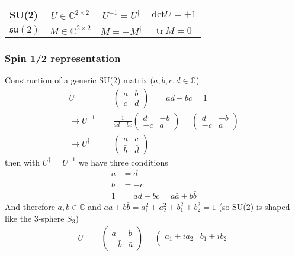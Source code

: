 \documentclass[../main.tex]{subfiles}
\begin{document}
\begin{itemize}
\begin{center}
\begin{tabular}{|l|c|c|c|}
\hline
SU(2)              & $U\in\mathbb{C}^{2\times2} $ & $U^{-1}=U^\dagger$ & $\text{det}U=+1$ \\ \hline
$\mathfrak{su}(2)$ & $M\in\mathbb{C}^{2\times2} $ & $M=-M^\dagger$ & $\text{tr}\,M=0$ \\ \hline
\end{tabular}
\end{center}

\subsubsection{Spin 1/2 representation}

Construction of a generic SU(2) matrix ($a, b, c, d\in\mathbb{C}$)
\begin{align*}
U&=\left(
\begin{matrix}
a & b\\
c & d
\end{matrix}
\right)\qquad ad-bc=1\\
\rightarrow U^{-1}&=\frac{1}{ad-bc}\left(
\begin{matrix}
d & -b\\
-c & a
\end{matrix}
\right)=\left(\begin{matrix}
d & -b\\
-c & a
\end{matrix}
\right)\\
\rightarrow U^\dagger&=\left(
\begin{matrix}
\bar{a} & \bar{c}\\
\bar{b} & \bar{d}
\end{matrix}
\right)
\end{align*}
then with $U^\dagger=U^{-1}$ we have three conditions
\begin{align}
\bar{a}&=d\\
\bar{b}&=-c\\
1&=ad-bc=a\bar{a}+b\bar{b}
\end{align}
And therefore $a,b \in \mathbb{C}$ and $a\bar{a}+b\bar{b}=a_1^2+a_2^2+b_1^2+b_2^2=1$ (so SU(2) is shaped like the 3-sphere $S_3$)
\begin{align*}
U&=\left(\begin{matrix}
a & b\\
-\bar{b} & \bar{a}
\end{matrix}
\right)
=\left(\begin{matrix}
a_1+ia_2 & b_1+ib_2\\

\end{matrix}
\end{align*}
\end{itemize}
\end{document}
